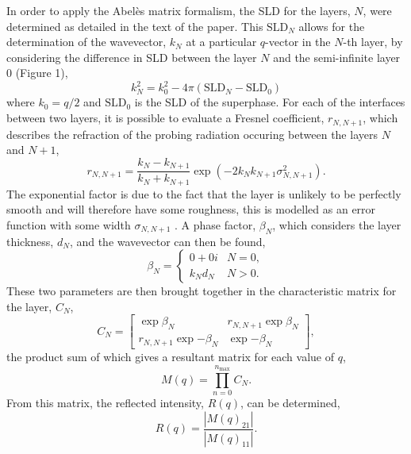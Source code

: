 \documentclass[amsmath,amssymb,superscriptaddress]{revtex4-1}
\begin{document}
In order to apply the Abel\`{e}s matrix formalism, the SLD for the layers, $N$, were determined as detailed in the text of the paper.
This $\text{SLD}_N$ allows for the determination of the wavevector, $k_N$ at a particular $q$-vector in the $N$-th layer, by considering the difference in SLD between the layer $N$ and the semi-infinite layer 0 (Figure 1),
%
\begin{equation}
	k_N^2 = k_0^2 - 4\pi(\text{SLD}_N - \text{SLD}_0)
\end{equation}
%
where $k_0 = q/2$ and $\text{SLD}_0$ is the SLD of the superphase.
For each of the interfaces between two layers, it is possible to evaluate a Fresnel coefficient, $r_{N,N+1}$, which describes the refraction of the probing radiation occuring between the layers $N$ and $N+1$,
%
\begin{equation}
	r_{N,N+1} = \frac{k_N - k_{N+1}}{k_N + k_{N+1}}\exp{(-2k_Nk_{N+1}\sigma^2_{N, N+1})}.
\end{equation}
%
The exponential factor is due to the fact that the layer is unlikely to be perfectly smooth and will therefore have some roughness, this is modelled as an error function with some width $\sigma_{N,N+1}$ \cite{nevot_caracterisation_1980}.
A phase factor, $\beta_N$, which considers the layer thickness, $d_N$, and the wavevector can then be found,
%
\begin{equation}
	\beta_N =
	\begin{cases}
		0 + 0i & N = 0, \\
		k_N d_N & N > 0.
	\end{cases}
\end{equation}
%
These two parameters are then brought together in the characteristic matrix for the layer, $C_N$,
%
\begin{equation}
	C_N =
	\begin{bmatrix}
		\exp{\beta_N} & r_{N,N+1} \exp{\beta_N} \\
		r_{N,N+1}\exp{-\beta_N} & \exp{-\beta_N}
	\end{bmatrix},
\end{equation}
%
the product sum of which gives a resultant matrix for each value of $q$,
%
\begin{equation}
	M(q) = \prod_{n=0}^{n_{\text{max}}} C_N.
\end{equation}
%
From this matrix, the reflected intensity, $R(q)$, can be determined,
%
\begin{equation}
	R(q) = \frac{|M(q)_{21}|}{|M(q)_{11}|}.
\end{equation}
%
\end{document}
